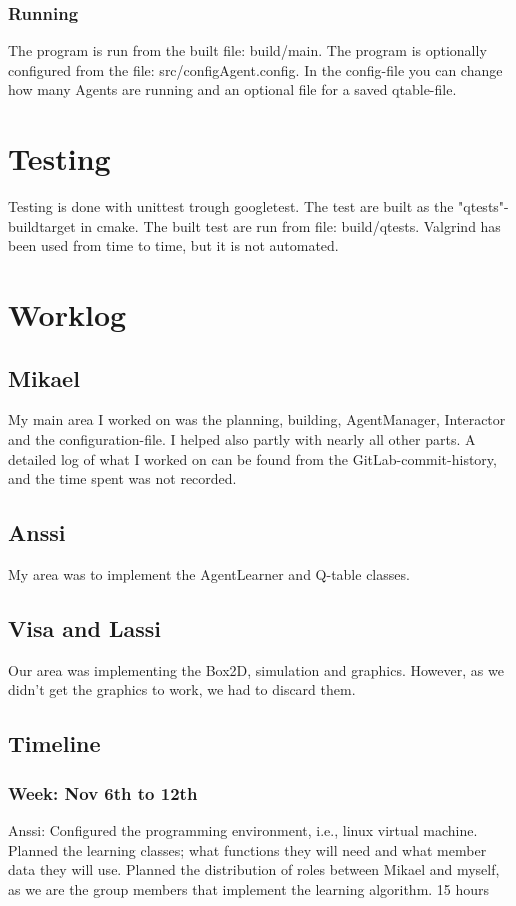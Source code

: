 \documentclass{article}
\begin{document}
\subsubsection{Running}
The program is run from the built file: build/main.
The program is optionally configured from the file: src/configAgent.config.
In the config-file you can change how many Agents are running and
an optional file for a saved qtable-file.


\section{Testing}
Testing is done with unittest trough googletest.
The test are built as the "qtests"-buildtarget in cmake.
The built test are run from file: build/qtests.
Valgrind has been used from time to time, but it is not automated.


\section{Worklog}

\subsection{Mikael}
My main area I worked on was the planning, building, AgentManager,
Interactor and the configuration-file. I helped also partly with nearly all
other parts.
A detailed log of what I worked on can be found from the GitLab-commit-history,
and the time spent was not recorded.

\subsection{Anssi}
My area was to implement the AgentLearner and Q-table classes.

\subsection{Visa and Lassi}
Our area was implementing the Box2D, simulation and graphics. However, as we didn't
get the graphics to work, we had to discard them.

\subsection{Timeline}

\subsubsection{Week: Nov 6th to 12th}
Anssi:
Configured the programming environment, i.e., linux virtual machine.
Planned the learning classes; what functions they will need and what
member data they will use. Planned the distribution of roles between
Mikael and myself, as we are the group members that implement the learning
algorithm.
15 hours
\end{document}
